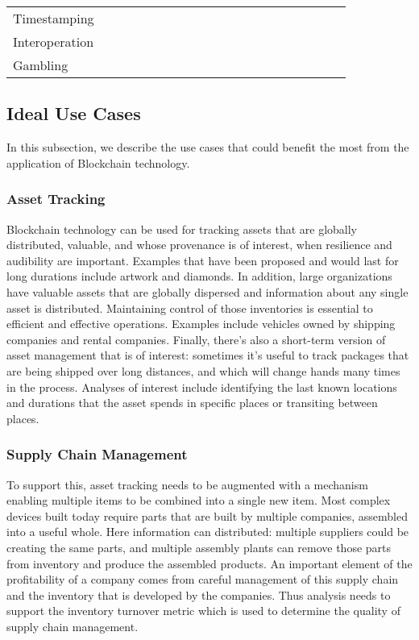 \begin{table*}[th!]
\begin{tabular}{l|cccccccc|ccccccccccc|}
\hline

Timestamping			&\full	&	&\full	&\full	&	&	&	&		&\full	&\full	&	&	&	&	&	&	&	&	&	\\		
Interoperation			&	&\full	&	&	&	&	&	&		&	&	&	&	&	&	&	&	&	&	&	\\
Gambling				&	&\full	&	&\full	&	&	&	&		&	&	&	&	&	&	&	&	&	&	&	\\ 

\hline

\end{tabular}
\end{table*}

\subsection{Ideal Use Cases}
In this subsection, we describe the use cases that could benefit the most from the application of Blockchain technology.

\subsubsection{Asset Tracking} Blockchain technology can be used for tracking assets that are globally distributed, valuable, and whose provenance is of interest, when resilience and audibility are important.  Examples that have been proposed and would last for long durations include artwork and diamonds.  In addition, large organizations have valuable assets that are globally dispersed and information about any single asset is distributed.  Maintaining control of those inventories is essential to efficient and effective operations.  Examples include vehicles owned by shipping companies and rental companies.  Finally, there's also a short-term version of asset management that is of interest: sometimes it's useful to track packages that are being shipped over long distances, and which will change hands many times in the process.  Analyses of interest include identifying the last known locations and durations that the asset spends in specific places or transiting between places.

\subsubsection{Supply Chain Management}
To support this, asset tracking needs to be augmented with a mechanism enabling multiple items to be combined into a single new item.  Most complex devices built today require parts that are built by multiple companies, assembled into a useful whole. Here information can distributed: multiple suppliers could be creating the same parts, and multiple assembly plants can remove those parts from inventory and produce the assembled products.  An important element of the profitability of a company comes from careful management of this supply chain and the inventory that is developed by the companies.  Thus analysis needs to support the inventory turnover metric which is used to determine the quality of supply chain management.

